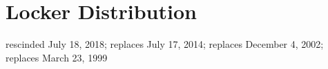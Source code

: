 \section{Locker Distribution}
rescinded July 18, 2018; replaces July 17, 2014; replaces December 4, 2002; replaces March 23, 1999\\
